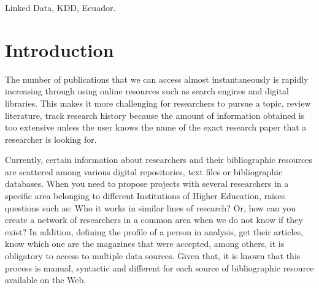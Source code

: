 \documentclass[11pt]{article}
\begin{document}
\begin{keywords}
Linked Data, KDD, Ecuador.
\end{keywords}


\section{Introduction}
\label{sec:Intro}


The number of publications that we can access almost instantaneously is rapidly increasing through using online resources such as search engines and digital libraries. This makes it more challenging for researchers to pursue a topic, review literature, track research history because the amount of information obtained is too extensive unless the user knows the name of the exact research paper that a researcher is looking for.


Currently, certain information about researchers and their bibliographic resources are scattered among various digital repositories, text files or bibliographic databases. When you need to propose projects with several researchers in a specific area belonging to different Institutions of Higher Education, %
raises questions such as: Who it works in similar lines of research? Or, how can you create a network of researchers in a common area when we do not know if they exist? In addition, defining the profile of a person in analysis, get their articles, know which one are the magazines that were accepted, among others, it is obligatory to access to multiple data sources. Given that, it is known that this process is manual, syntactic and different for each source of bibliographic resource available on the Web.
\end{document}
